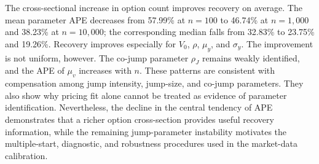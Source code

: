 The cross-sectional increase in option count improves recovery on average.
The mean parameter APE decreases from 57.99\% at $n=100$ to 46.74\% at
$n=1{,}000$ and 38.23\% at $n=10{,}000$; the corresponding median falls from
32.83\% to 23.75\% and 19.26\%. Recovery improves especially for $V_0$,
$\rho$, $\mu_y$, and $\sigma_y$. The improvement is not uniform, however.
The co-jump parameter $\rho_J$ remains weakly identified, and the APE of
$\mu_v$ increases with $n$. These patterns are consistent with compensation
among jump intensity, jump-size, and co-jump parameters. They also show why
pricing fit alone cannot be treated as evidence of parameter identification.
Nevertheless, the decline in the central tendency of APE demonstrates that a
richer option cross-section provides useful recovery information, while the
remaining jump-parameter instability motivates the multiple-start,
diagnostic, and robustness procedures used in the market-data calibration.


